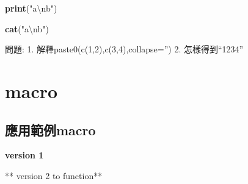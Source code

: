 \documentclass[]{book}
\newenvironment{Shaded}{\begin{snugshade}}{\end{snugshade}}
\newcommand{\CharTok}[1]{\textcolor[rgb]{0.31,0.60,0.02}{#1}}
\newcommand{\ControlFlowTok}[1]{\textcolor[rgb]{0.13,0.29,0.53}{\textbf{#1}}}
\newcommand{\KeywordTok}[1]{\textcolor[rgb]{0.13,0.29,0.53}{\textbf{#1}}}
\newcommand{\NormalTok}[1]{#1}
\newcommand{\StringTok}[1]{\textcolor[rgb]{0.31,0.60,0.02}{#1}}
\theoremstyle{definition}
\theoremstyle{definition}
\theoremstyle{definition}
\theoremstyle{remark}
\begin{document}
\begin{Shaded}
\begin{Highlighting}[]
\KeywordTok{print}\NormalTok{(}\StringTok{"a}\CharTok{\textbackslash{}n}\StringTok{b"}\NormalTok{)}
\end{Highlighting}
\end{Shaded}

\begin{Shaded}
\begin{Highlighting}[]
\KeywordTok{cat}\NormalTok{(}\StringTok{"a}\CharTok{\textbackslash{}n}\StringTok{b"}\NormalTok{)}
\end{Highlighting}
\end{Shaded}

問題: 1. 解釋paste0(c(1,2),c(3,4),collapse='') 2. 怎樣得到``1234''

\hypertarget{macro}{%
\section{macro}\label{macro}}

\hypertarget{macro}{%
\subsection{應用範例macro}\label{macro}}

\textbf{version 1}

\begin{Shaded}
\end{Shaded}

** version 2 to function**

\begin{Shaded}
\end{Shaded}
\end{document}
